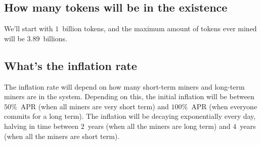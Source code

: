 \documentclass[longbibliography,nofootinbib,twocolumn]{revtex4-1}
\begin{document}
\subsection{How many tokens will be in the existence}
We'll start with $1$~billion tokens, and the maximum amount of tokens ever mined will be $3.89$~billions.

\subsection{What's the inflation rate}
The inflation rate will depend on how many short-term miners and long-term miners are in the system.
Depending on this, the initial inflation will be between $50\%$~APR (when all miners are very short term) and $100\%$~APR (when everyone commits for a long
term).
The inflation will be decaying exponentially every day, halving in time between $2$~years (when all the miners are long term)
and $4$~years (when all the miners are short term).


\end{document}
